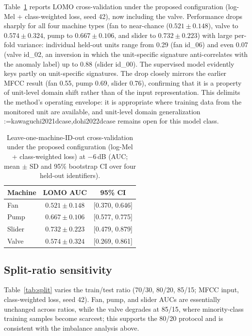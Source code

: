 \documentclass[review,nopreprintline]{elsarticle}
\makeatletter
\newif\ifmc@notfirst
\let\@oldcite\cite
\def\mc@splitcite#1{%
    \begingroup
    \mc@notfirstfalse
    \@for\@citekey:=#1\do{%
      \ifmc@notfirst, \fi
      \mc@notfirsttrue
      \@oldcite{\@citekey}%
    }%
    \endgroup
  }%
\def\cite#1{\protect\mc@splitcite{#1}}%
\makeatother
\begin{document}
Table~\ref{tab:lomo} reports LOMO cross-validation under the proposed configuration (log-Mel + class-weighted loss, seed 42), now including the valve. Performance drops sharply for all four machine types (fan to near-chance ($0.521\pm0.148$), valve to $0.574\pm0.324$, pump to $0.667\pm0.106$, and slider to $0.732\pm0.223$) with large per-fold variance: individual held-out units range from 0.29 (fan id\_06) and even 0.07 (valve id\_02, an inversion in which the unit-specific signature anti-correlates with the anomaly label) up to 0.88 (slider id\_00). The supervised model evidently keys partly on unit-specific signatures. The drop closely mirrors the earlier MFCC result (fan 0.55, pump 0.69, slider 0.76), confirming that it is a property of unit-level domain shift rather than of the input representation. This delimits the method's operating envelope: it is appropriate where training data from the monitored unit are available, and unit-level domain generalization~\cite{kawaguchi2021dcase,dohi2022dcase} remains open for this model class.

\begin{table}[t]
\centering
\caption{Leave-one-machine-ID-out cross-validation under the proposed configuration (log-Mel + class-weighted loss) at $-6$\,dB (AUC; mean $\pm$ SD and 95\% bootstrap CI over four held-out identifiers).}
\label{tab:lomo}
\begin{tabular}{lcc}
\toprule
Machine & LOMO AUC & 95\% CI \\
\midrule
Fan    & $0.521 \pm 0.148$ & [0.370, 0.646] \\
Pump   & $0.667 \pm 0.106$ & [0.577, 0.775] \\
Slider & $0.732 \pm 0.223$ & [0.479, 0.879] \\
Valve  & $0.574 \pm 0.324$ & [0.269, 0.861] \\
\bottomrule
\end{tabular}
\end{table}

\subsection{Split-ratio sensitivity}
Table~\ref{tab:split} varies the train/test ratio (70/30, 80/20, 85/15; MFCC input, class-weighted loss, seed 42). Fan, pump, and slider AUCs are essentially unchanged across ratios, while the valve degrades at 85/15, where minority-class training samples become scarcest; this supports the 80/20 protocol and is consistent with the imbalance analysis above.
\end{document}
